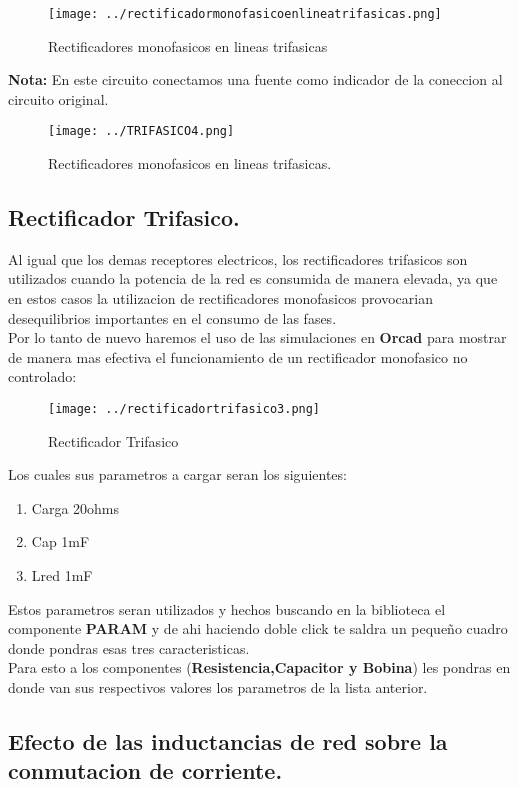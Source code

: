 \documentclass[11pt,a4paper]{article}
\begin{document}
\begin{figure}[h]
\centering
\texttt{[image: ../rectificadormonofasicoenlineatrifasicas.png]} 
\caption{Rectificadores monofasicos en lineas trifasicas}
\end{figure}
 
\textbf{Nota:} En este circuito conectamos una fuente como indicador de la coneccion al circuito original.

\begin{figure}[h]
\centering
\texttt{[image: ../TRIFASICO4.png]} 
\caption{Rectificadores monofasicos en lineas trifasicas.}
\end{figure}

\subsection{Rectificador Trifasico.}
Al igual que los demas receptores electricos, los rectificadores trifasicos  son utilizados cuando la potencia de la red es consumida de manera elevada, ya que en estos casos la utilizacion de rectificadores monofasicos provocarian desequilibrios importantes en el consumo de las fases.\\
Por lo tanto de nuevo haremos el uso de las simulaciones en \textbf{Orcad} para mostrar de manera mas efectiva el funcionamiento de un rectificador monofasico no controlado:

\begin{figure}[h]
\centering
\texttt{[image: ../rectificadortrifasico3.png]} 
\caption{Rectificador Trifasico}
\end{figure}

Los cuales sus parametros a cargar seran los siguientes:
\begin{enumerate}
\item Carga 20ohms
\item Cap 1mF
\item Lred 1mF
\end{enumerate}

Estos parametros seran utilizados y hechos buscando en la biblioteca el componente \textbf{PARAM} y de ahi haciendo doble click te saldra un pequeño cuadro donde pondras esas tres caracteristicas.\\
Para esto a los componentes (\textbf{Resistencia,Capacitor y Bobina}) les pondras en donde van sus respectivos valores los parametros de la lista anterior.

\subsection{Efecto de las inductancias de red sobre la conmutacion de corriente.}
\end{document}
